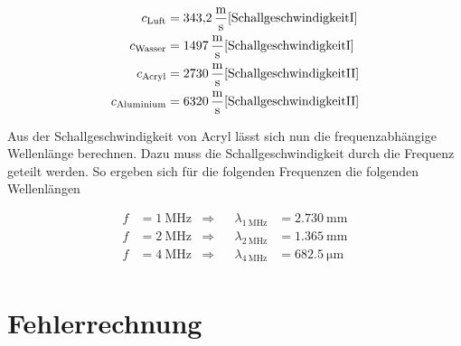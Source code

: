 \begin{align}
    c_\text{Luft}   &= \qty{343,2}{\meter \per \second}    \text{\cite{SchallgeschwindigkeitI}}     \\
    c_\text{Wasser} &= \qty{1497}{\meter \per \second}     \text{\cite{SchallgeschwindigkeitI}}    \\
    c_\text{Acryl}  &= \qty{2730}{\meter \per \second}     \text{\cite{SchallgeschwindigkeitII}}    \\
    c_\text{Aluminium} &= \qty{6320}{\meter \per \second}  \text{\cite{SchallgeschwindigkeitII}}     \\
\end{align}

\noindent Aus der Schallgeschwindigkeit von Acryl lässt sich nun die frequenzabhängige Wellenlänge berechnen. 
Dazu muss die Schallgeschwindigkeit durch die Frequenz geteilt werden. So ergeben sich für die folgenden Frequenzen 
die folgenden Wellenlängen

\begin{align}
    f &= \qty{1}{\mega \hertz} & \Rightarrow& & \lambda_{\qty{1}{\mega \hertz}} &= \qty{2,730}{\milli \meter}   \\
    f &= \qty{2}{\mega \hertz} & \Rightarrow& & \lambda_{\qty{2}{\mega \hertz}} &= \qty{1,365}{\milli \meter}   \\
    f &= \qty{4}{\mega \hertz} & \Rightarrow& & \lambda_{\qty{4}{\mega \hertz}} &= \qty{682,5}{\micro \meter}   \\
\end{align}



\section{Fehlerrechnung}
